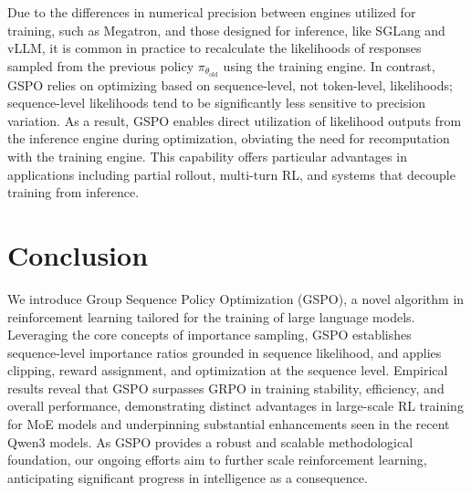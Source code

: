 Due to the differences in numerical precision between engines utilized for training, such as Megatron, and those designed for inference, like SGLang and vLLM, it is common in practice to recalculate the likelihoods of responses sampled from the previous policy $\pi_{\theta_\text{old}}$ using the training engine. In contrast, GSPO relies on optimizing based on sequence-level, not token-level, likelihoods; sequence-level likelihoods tend to be significantly less sensitive to precision variation. As a result, GSPO enables direct utilization of likelihood outputs from the inference engine during optimization, obviating the need for recomputation with the training engine. This capability offers particular advantages in applications including partial rollout, multi-turn RL, and systems that decouple training from inference.

\section{Conclusion}

We introduce Group Sequence Policy Optimization (GSPO), a novel algorithm in reinforcement learning tailored for the training of large language models. Leveraging the core concepts of importance sampling, GSPO establishes sequence-level importance ratios grounded in sequence likelihood, and applies clipping, reward assignment, and optimization at the sequence level. Empirical results reveal that GSPO surpasses GRPO in training stability, efficiency, and overall performance, demonstrating distinct advantages in large-scale RL training for MoE models and underpinning substantial enhancements seen in the recent Qwen3 models. As GSPO provides a robust and scalable methodological foundation, our ongoing efforts aim to further scale reinforcement learning, anticipating significant progress in intelligence as a consequence.

